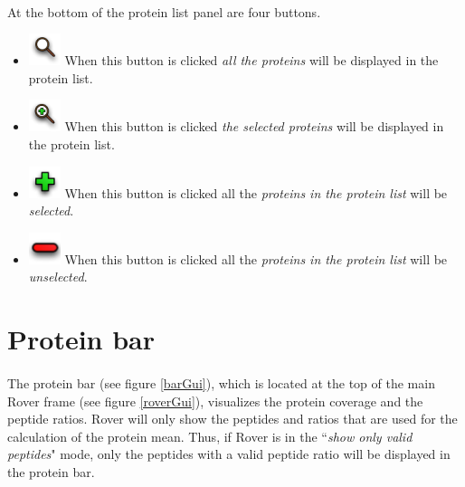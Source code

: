 \documentclass[11pt,a4paper,oneside,notitlepage]{book}
\begin{document}
\paragraph{}At the bottom of the protein list panel are four buttons.

\begin{itemize}		
\item \includegraphics[scale=0.6, H]{viewAll.png} When this button is clicked \emph{all the proteins} will be displayed in the protein list.
\item \includegraphics[scale=0.6, H]{viewSelection.png} When this button is clicked \emph{the selected proteins} will be displayed in the protein list.
\item \includegraphics[scale=0.6, H]{plus.png} When this button is clicked all the \emph{proteins in the protein list} will be \emph{selected}.
\item \includegraphics[scale=0.6, H]{min.png} When this button is clicked all the \emph{proteins in the protein list} will be \emph{unselected}.
\end{itemize}

\section{Protein bar}\label{Protein bar}

\paragraph{}The protein bar (see figure \ref{barGui}), which is located at the top of the main Rover frame (see figure \ref{roverGui}), visualizes the protein coverage and the peptide ratios. Rover will only show the peptides and ratios that are used for the calculation of the protein mean. Thus, if Rover is in the ``\textit{show only valid peptides}" mode, only the peptides with a valid peptide ratio will be displayed in the protein bar.
\end{document}
